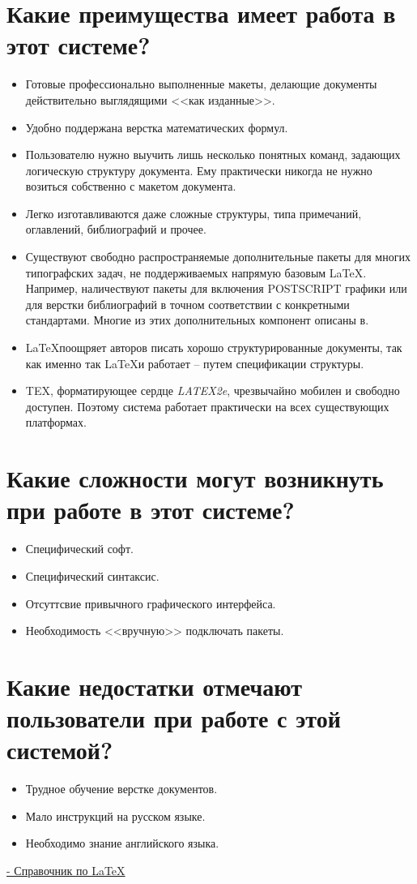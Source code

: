\documentclass[a4paper,12pt]{article} %
\begin{document}
\section{Какие преимущества имеет работа в этот системе?}
\begin{center}
\begin{itemize}
    \item Готовые профессионально выполненные макеты, делающие документы действительно выглядящими <<как изданные>>.
    \item Удобно поддержана верстка математических формул.
    \item Пользователю нужно выучить лишь несколько понятных команд, задающих логическую структуру документа. Ему практически никогда не нужно возиться собственно с макетом документа.
    \item Легко изготавливаются даже сложные структуры, типа примечаний, оглавлений, библиографий и прочее.
    \item Существуют свободно распространяемые дополнительные пакеты для многих типографских задач, не поддерживаемых напрямую базовым \LaTeX. Например, наличествуют пакеты для включения POSTSCRIPT графики или для верстки библиографий в точном соответствии с конкретными стандартами. Многие из этих дополнительных компонент описаны в.
    \item \LaTeX поощряет авторов писать хорошо структурированные документы, так как именно так \LaTeX и работает -- путем спецификации структуры.
    \item TEX, форматирующее сердце \textit{LATEX2e}, чрезвычайно мобилен и свободно доступен. Поэтому система работает практически на всех существующих платформах.
\end{itemize}
\end{center}
\section{Какие сложности могут возникнуть при работе в этот системе?}
\begin{itemize}
    \item Специфический софт.
    \item Специфический синтаксис.
    \item Отсуттсвие привычного графического интерфейса.
    \item Необходимость <<вручную>> подключать пакеты.
\end{itemize}
\section{Какие недостатки отмечают пользователи при работе с этой системой?}
\begin{itemize}
    \item Трудное обучение верстке документов.
    \item Мало инструкций на русском языке.
    \item Необходимо знание английского языка.
\end{itemize}

\href{http://fkn.ktu10.com/?q=node/2906}{ - Справочник по LaTeX}
\end{document}
